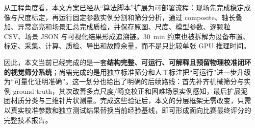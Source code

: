 从工程角度看，本文方案已经从“算法脚本”扩展为可部署流程：现场先完成稳定成像与尺度标定，再运行固定参数实例分割和筛分分析，通过 composite、轴长叠加、异常高亮和场景汇总完成质检，并保存原图、尺度、模型参数、逐颗粒 CSV、场景 JSON 与可视化结果形成追溯链。30~min 约束也被拆解为设备布置、标定、采集、计算、质检、导出和故障余量，而不是只比较单张 GPU 推理时间。

因此，本文当前已经完成的是一套\textbf{结构完整、可运行、可解释且预留物理校准闭环的视觉筛分系统}；尚需完成的是用独立标准筛分和人工标注把“可运行”进一步升级为“可量化证明准确”。这一划分也给出了明确的后续路线：首先补齐机械筛分与实例 ground truth，其次改善多点尺度/畸变校正和困难场景实例感知，最后扩展泥团材质分类与三维针片状测量。完成这些验证后，本文的分层框架无需改变，只需以真实校准参数和独立测试结果替换当前经验基线，即可形成面向比赛最终评分的完整技术报告。
